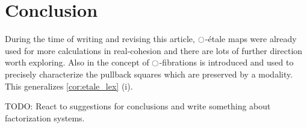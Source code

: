 \documentclass[9pt,twosided]{amsart}
\newcommand{\todo}[1]{{\color{red}TODO: #1 \\}}
\begin{document}
\section{Conclusion}
During the time of writing and revising this article,
${\ocircle}$-étale maps were already used for more calculations in real-cohesion \cite{myers2019}
and there are lots of further direction worth exploring.
Also in \cite{myers2019} the concept of ${\ocircle}$-fibrations is introduced
and used to precisely characterize the pullback squares which are preserved by a modality.
This generalizes \cref{cor:etale_lex} (i).

\todo{React to suggestions for conclusions and write something about factorization systems.}

\printbibliography
\end{document}
